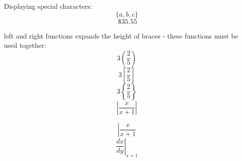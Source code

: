 \documentclass[11]{article}
\begin{document}
Displaying special characters:
$$ \{a, b, c\} $$ %
$$ \ \$ 35.55 $$ %

left and right functions expands the height of braces - these functions must be used together:
$$ 3\left(\frac{2}{5}\right) $$
$$ 3\left[\frac{2}{5}\right] $$
$$ 3\left\{\frac{2}{5}\right\} $$
$$ \left|\frac{x}{x+1}\right| $$

$$ \left| \frac{x}{x+1} \right. $$ %
$$ \left. \frac{dx}{dy} \right|_{x = 1} $$ 
\end{document}
